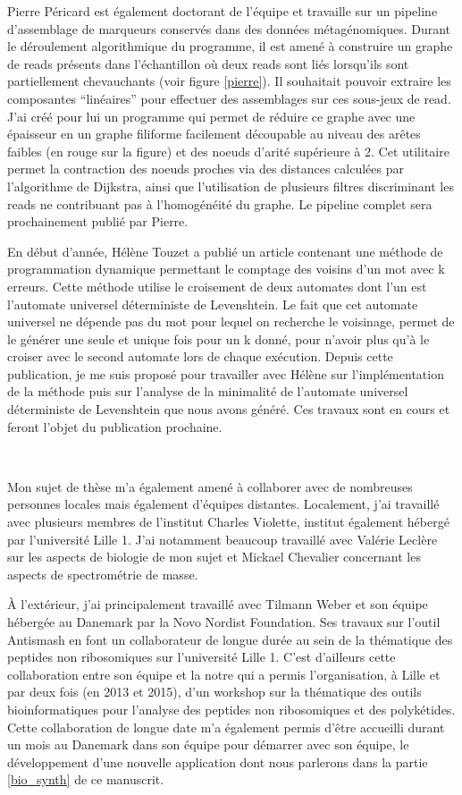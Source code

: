 Pierre Péricard est également doctorant de l'équipe et travaille sur un pipeline d'assemblage de marqueurs conservés dans des données métagénomiques.
Durant le déroulement algorithmique du programme, il est amené à construire un graphe de reads présents dans l'échantillon où deux reads sont liés lorsqu'ils sont partiellement chevauchants (voir figure \ref{pierre}).
Il souhaitait pouvoir extraire les composantes ``linéaires'' pour effectuer des assemblages sur ces sous-jeux de read.
J'ai créé pour lui un programme qui permet de réduire ce graphe avec une épaisseur en un graphe filiforme facilement découpable au niveau des arêtes faibles (en rouge sur la figure) et des noeuds d'arité supérieure à 2.
Cet utilitaire permet la contraction des noeuds proches via des distances calculées par l'algorithme de Dijkstra, ainsi que l'utilisation de plusieurs filtres discriminant les reads ne contribuant pas à l'homogénéité du graphe.
Le pipeline complet sera prochainement publié par Pierre.

En début d'année, Hélène Touzet a publié un article contenant une méthode de programmation dynamique permettant le comptage des voisins d'un mot avec k erreurs.
Cette méthode utilise le croisement de deux automates dont l'un est l'automate universel déterministe de Levenshtein.
Le fait que cet automate universel ne dépende pas du mot pour lequel on recherche le voisinage, permet de le générer une seule et unique fois pour un k donné, pour n'avoir plus qu'à le croiser avec le second automate lors de chaque exécution.
Depuis cette publication, je me suis proposé pour travailler avec Hélène sur l'implémentation de la méthode puis sur l'analyse de la minimalité de l'automate universel déterministe de Levenshtein que nous avons généré.
Ces travaux sont en cours et feront l'objet du publication prochaine.

~~

Mon sujet de thèse m'a également amené à collaborer avec de nombreuses personnes locales mais également d'équipes distantes.
Localement, j'ai travaillé avec plusieurs membres de l'institut Charles Violette, institut également hébergé par l'université Lille 1.
J'ai notamment beaucoup travaillé avec Valérie Leclère sur les aspects de biologie de mon sujet et Mickael Chevalier concernant les aspects de spectrométrie de masse.

À l'extérieur, j'ai principalement travaillé avec Tilmann Weber et son équipe hébergée au Danemark par la Novo Nordist Foundation.
Ses travaux sur l'outil Antismash en font un collaborateur de longue durée au sein de la thématique des peptides non ribosomiques sur l'université Lille 1.
C'est d'ailleurs cette collaboration entre son équipe et la notre qui a permis l'organisation, à Lille et par deux fois (en 2013 et 2015), d'un workshop sur la thématique des outils bioinformatiques pour l'analyse des peptides non ribosomiques et des polykétides.
Cette collaboration de longue date m'a également permis d'être accueilli durant un mois au Danemark dans son équipe pour démarrer avec son équipe, le développement d'une nouvelle application dont nous parlerons dans la partie \ref{bio_synth} de ce manuscrit.

